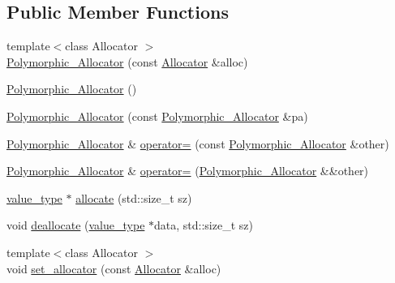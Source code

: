 \subsection*{Public Member Functions}
\begin{DoxyCompactItemize}
\item 
{\footnotesize template$<$class Allocator $>$ }\\\hyperlink{structbc_1_1allocators_1_1Polymorphic__Allocator_a5a51c02d87ee89f98ed1a192e1a7fc31}{Polymorphic\+\_\+\+Allocator} (const \hyperlink{classbc_1_1allocators_1_1Allocator}{Allocator} \&alloc)
\item 
\hyperlink{structbc_1_1allocators_1_1Polymorphic__Allocator_a85b994bea749c2177e0d9701b80c04e7}{Polymorphic\+\_\+\+Allocator} ()
\item 
\hyperlink{structbc_1_1allocators_1_1Polymorphic__Allocator_a6292876d2a1f87790a57a0382ff59659}{Polymorphic\+\_\+\+Allocator} (const \hyperlink{structbc_1_1allocators_1_1Polymorphic__Allocator}{Polymorphic\+\_\+\+Allocator} \&pa)
\item 
\hyperlink{structbc_1_1allocators_1_1Polymorphic__Allocator}{Polymorphic\+\_\+\+Allocator} \& \hyperlink{structbc_1_1allocators_1_1Polymorphic__Allocator_ab39a8d3c81d7cfee0936a6468a733457}{operator=} (const \hyperlink{structbc_1_1allocators_1_1Polymorphic__Allocator}{Polymorphic\+\_\+\+Allocator} \&other)
\item 
\hyperlink{structbc_1_1allocators_1_1Polymorphic__Allocator}{Polymorphic\+\_\+\+Allocator} \& \hyperlink{structbc_1_1allocators_1_1Polymorphic__Allocator_a5154dccc457921adedc351e062f459df}{operator=} (\hyperlink{structbc_1_1allocators_1_1Polymorphic__Allocator}{Polymorphic\+\_\+\+Allocator} \&\&other)
\item 
\hyperlink{structbc_1_1allocators_1_1Polymorphic__Allocator_a2655c4bc3c86364c42aa20639a1b7a44}{value\+\_\+type} $\ast$ \hyperlink{structbc_1_1allocators_1_1Polymorphic__Allocator_aa6a9f6a990f5442fceac09a0c03c3c68}{allocate} (std\+::size\+\_\+t sz)
\item 
void \hyperlink{structbc_1_1allocators_1_1Polymorphic__Allocator_a9935a902159810ea1e948df8c586d76e}{deallocate} (\hyperlink{structbc_1_1allocators_1_1Polymorphic__Allocator_a2655c4bc3c86364c42aa20639a1b7a44}{value\+\_\+type} $\ast$data, std\+::size\+\_\+t sz)
\item 
{\footnotesize template$<$class Allocator $>$ }\\void \hyperlink{structbc_1_1allocators_1_1Polymorphic__Allocator_adfaa9129bea6203c411df03cd959fe3f}{set\+\_\+allocator} (const \hyperlink{classbc_1_1allocators_1_1Allocator}{Allocator} \&alloc)

\end{DoxyCompactItemize}
